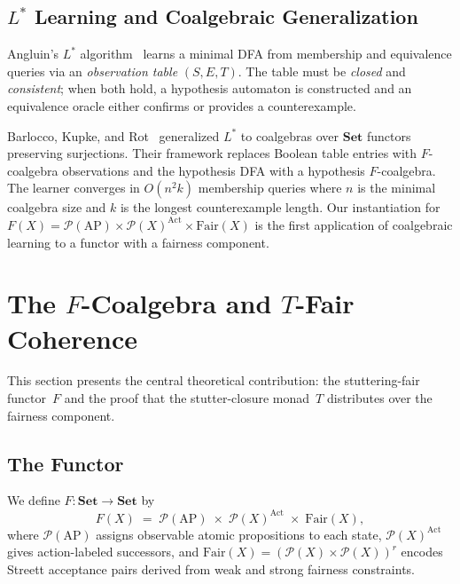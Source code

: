 \documentclass[11pt]{article}
\newcommand{\Set}{\mathbf{Set}}
\newcommand{\Pow}{\mathcal{P}}
\newcommand{\Fair}{\ensuremath{\mathrm{Fair}}}
\newcommand{\Act}{\ensuremath{\mathrm{Act}}}
\newcommand{\AP}{\ensuremath{\mathrm{AP}}}
\newcommand{\TFair}{$T$-Fair}
\begin{document}
\subsection{$L^*$ Learning and Coalgebraic Generalization}

Angluin's $L^*$ algorithm~\cite{Angluin87} learns a minimal DFA from
membership and equivalence queries via an \emph{observation table}
$(S, E, T)$.
The table must be \emph{closed} and \emph{consistent}; when both hold,
a hypothesis automaton is constructed and an equivalence oracle either
confirms or provides a counterexample.

Barlocco, Kupke, and Rot~\cite{BarloccoKR19} generalized $L^*$ to
coalgebras over $\Set$ functors preserving surjections.
Their framework replaces Boolean table entries with $F$-coalgebra
observations and the hypothesis DFA with a hypothesis $F$-coalgebra.
The learner converges in $O(n^2 k)$ membership queries where $n$ is the
minimal coalgebra size and $k$ is the longest counterexample length.
Our instantiation for
$F(X) = \Pow(\AP) \times \Pow(X)^{\Act} \times \Fair(X)$
is the first application of coalgebraic learning to a functor with a
fairness component.

\section{The $F$-Coalgebra and \TFair{} Coherence}
\label{sec:functor}

This section presents the central theoretical contribution: the
stuttering-fair functor~$F$ and the proof that the stutter-closure
monad~$T$ distributes over the fairness component.

\subsection{The Functor}

We define $F : \Set \to \Set$ by
\begin{equation}\label{eq:functor}
  F(X) \;=\; \Pow(\AP) \;\times\; \Pow(X)^{\Act} \;\times\; \Fair(X),
\end{equation}
where $\Pow(\AP)$ assigns observable atomic propositions to each state,
$\Pow(X)^{\Act}$ gives action-labeled successors, and
$\Fair(X) = (\Pow(X) \times \Pow(X))^r$ encodes Streett acceptance pairs
derived from weak and strong fairness constraints.
\end{document}
